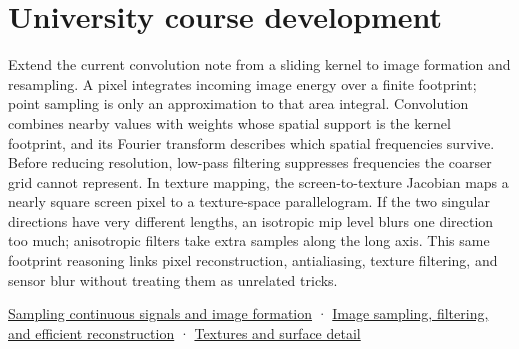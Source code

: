 \section{University course development}\label{appendix-d5b3c692d9f0-university-course-development}

Extend the current convolution note from a sliding kernel to image formation and resampling. A pixel integrates incoming image energy over a finite footprint; point sampling is only an approximation to that area integral. Convolution combines nearby values with weights whose spatial support is the kernel footprint, and its Fourier transform describes which spatial frequencies survive. Before reducing resolution, low-pass filtering suppresses frequencies the coarser grid cannot represent. In texture mapping, the screen-to-texture Jacobian maps a nearly square screen pixel to a texture-space parallelogram. If the two singular directions have very different lengths, an isotropic mip level blurs one direction too much; anisotropic filters take extra samples along the long axis. This same footprint reasoning links pixel reconstruction, antialiasing, texture filtering, and sensor blur without treating them as unrelated tricks.

\href{Continuous\%20Notes/University\%20-\%20Worlds,\%20Images\%20and\%20Inference\%20-\%20Graphics,\%20Vision\%20and\%20Photography\#Sampling\%20continuous\%20signals\%20and\%20image\%20formation}{Sampling continuous signals and image formation} · \href{Continuous\%20Notes/University\%20-\%20Worlds,\%20Images\%20and\%20Inference\%20-\%20Graphics,\%20Vision\%20and\%20Photography\#Image\%20sampling,\%20filtering,\%20and\%20efficient\%20reconstruction}{Image sampling, filtering, and efficient reconstruction} · \href{Continuous\%20Notes/University\%20-\%20Worlds,\%20Images\%20and\%20Inference\%20-\%20Graphics,\%20Vision\%20and\%20Photography\#Textures\%20and\%20surface\%20detail}{Textures and surface detail}
